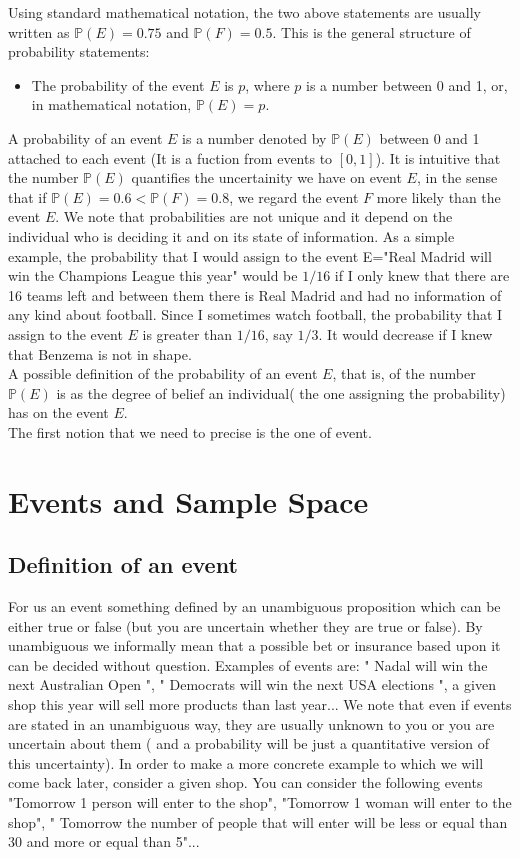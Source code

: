 \documentclass[12pt]{article}
\newcommand{\<}{{\langle \!\! \langle}}
\renewcommand{\>}{{\rangle \!\! \rangle}}
\begin{document}
Using standard mathematical notation, the two above statements are usually written as $\mathbb{P}(E)=0.75$ and $ \mathbb{P}(F)=0.5$. This is the general structure of probability statements: 

\begin{itemize}
	\item The probability of the event $E$  is $p$, where $p$ is a number between 0 and 1, or, in mathematical notation, $\mathbb{P}(E)=p$.    
\end{itemize} 

A probability of an event $E$ is a number denoted by $\mathbb{P}(E)$ between 0 and 1 attached to each event (It is a fuction from events to $[0,1]$). It is intuitive that the number $\mathbb{P}(E)$ quantifies the uncertainity we have on event $E$, in the sense that if $\mathbb{P}(E)=0.6< \mathbb{P}(F)=0.8$, we regard the event $F$ more likely than the event $E$. We note that probabilities are not unique and it depend on the individual who is deciding it  and on its state of information. As a simple example, the probability that I would assign to the event E="Real Madrid will win the Champions League this year" would be $1/16$ if I only knew that there are 16 teams left and between them there is Real Madrid and had no information of any kind about football. Since I sometimes watch football, the probability that I assign to the event $E$ is greater than $1/16$, say $1/3$. It would decrease if I knew that Benzema is not in shape.\\
A possible definition of the probability of an event $E$, that is, of the number $\mathbb{P}(E)$ is as the degree  of belief an individual( the one assigning the probability) has on the event $E$. \\
The first notion that we need to precise is the one of event.

\section{Events and Sample Space}

\subsection{Definition of an event}


For us an event something defined by an unambiguous proposition which can be either true or false (but you are uncertain whether they are true or false). By unambiguous we informally mean that a possible bet or insurance  based upon it can be decided without question. 
Examples of events are: " Nadal will win the next Australian Open ", " Democrats will win the next USA elections ", a given shop this year will sell more products than  last year... We note that even if events are stated in an unambiguous way, they are usually unknown to you or you are uncertain about them ( and a probability will be just a quantitative version of this uncertainty). 
In order to make a more concrete example to which we will come back later, consider a given shop. You can consider the following events "Tomorrow 1 person will enter to the shop", "Tomorrow 1 woman will enter to the shop", " Tomorrow the number of people that will enter will be less or equal than 30 and more or equal than 5"... 
\end{document}
